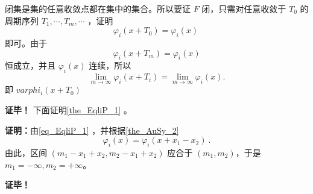 闭集是集的任意收敛点都在集中的集合。所以要证 $F$ 闭，只需对任意收敛于 $T_0$ 的周期序列 $T_1,\cdots, T_m,\cdots$ ，证明
\begin{equation}
\varphi_i(x+T_0)=\varphi_i(x)~
\end{equation}
即可。由于
\begin{equation}
\varphi_i(x+T_m)=\varphi_i(x)
\end{equation}
恒成立，并且 $\varphi_i(x)$ 连续，所以
\begin{equation}
\lim_{m\rightarrow\infty}\varphi_i(x+T_i)=\lim_{m\rightarrow\infty}\varphi_i(x).
\end{equation}
即 $varphi_i(x+T_0)$


\textbf{证毕！}
下面证明\autoref{the_EqliP_1} 。

\textbf{证明：}由\autoref{eq_EqliP_1} ，并根据\autoref{the_AuSy_2}~
\begin{equation}
\varphi_i(x)=\varphi_i(x+x_1-x_2)~.
\end{equation}
由此，区间 $(m_1-x_1+x_2,m_2-x_1+x_2)$ 应合于 $(m_1,m_2)$，于是 $m_1=-\infty,m_2=+\infty$。


\textbf{证毕！}












